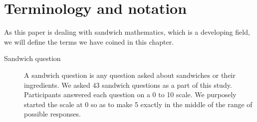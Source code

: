 \chapter{Terminology and notation}

As this paper is dealing with sandwich mathematics, which is a developing field, we will define the terms we have coined in this chapter.

\begin{description}
	\item[Sandwich question] A sandwich question is any question asked about sandwiches or their ingredients. We asked 43 sandwich questions as a part of this study. Participants answered each question on a 0 to 10 scale. We purposely started the scale at 0 so as to make 5 exactly in the middle of the range of possible responses.
\end{description}
